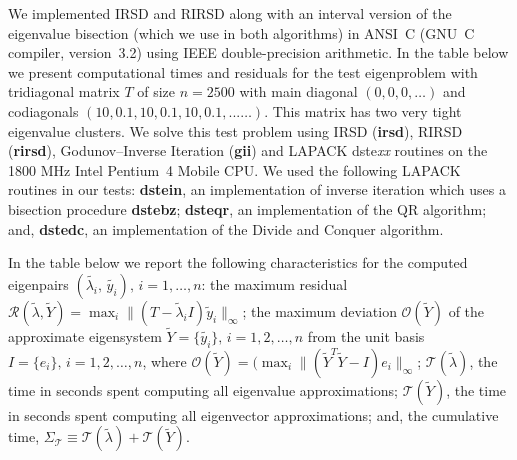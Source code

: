 \documentclass{report}
\begin{document}
We implemented IRSD and RIRSD along with an interval version of
the eigenvalue bisection (which we use in both algorithms)
in ANSI~C (GNU~C compiler, version~3.2) using IEEE
double-precision arithmetic. In the table below we present
computational times and residuals for the test eigenproblem with
tridiagonal matrix $T$ of size $n=2500$ with main diagonal $(0,
0, 0, \ldots)$ and codiagonals $(10, 0.1, 10, 0.1, 10, 0.1,
...\ldots)$. This matrix has two very tight eigenvalue clusters.
We solve this test problem using IRSD (\textbf{irsd}), RIRSD (\textbf{rirsd}),
Godunov--Inverse Iteration (\textbf{gii}) and
LAPACK dste\emph{xx} routines on the 1800 MHz
Intel\textregistered{} Pentium~4 Mobile\textregistered{} CPU\@.
We used the following LAPACK routines in our tests:
\textbf{dstein}, an implementation of inverse iteration which
uses a bisection procedure \textbf{dstebz};
\textbf{dsteqr}, an implementation of the QR algorithm; and,
\textbf{dstedc}, an implementation of the Divide and Conquer algorithm.

In the table below we report the following characteristics for
the computed eigenpairs
$(\tilde{\lambda_i},\,\tilde{y_i}),\,i=1,\ldots, n$: the maximum
residual $\mathcal{R}(\tilde{\lambda}, \tilde{Y}) = \max_i \| (T
- \tilde{\lambda}_i I) \tilde{y}_i \|_\infty$; the maximum
deviation $\mathcal{O}(\tilde{Y})$ of the approximate eigensystem
$\tilde{Y} = \{\tilde{y_i}\},\, i = 1, 2, \ldots, n$ from the unit basis
$I = \{e_i\},\, i = 1, 2,\ldots, n$, where
$\mathcal{O}(\tilde{Y})=(\max_i \|(\tilde{Y}^T \tilde{Y} - I)
e_i\|_\infty$; $\mathcal{T}( \tilde{\lambda})$, the time in seconds spent
computing all eigenvalue
approximations; $\mathcal{T}( \tilde{Y})$, the time in seconds
spent computing all eigenvector approximations; and, the
cumulative time, $\Sigma_{\mathcal{T}} \equiv
\mathcal{T}(\tilde{\lambda}) + \mathcal{T}( \tilde{Y})$.

\begin{table}[hbtp]
\centering
{}
\label{tbl:TestNew}
\end{table}
\end{document}
